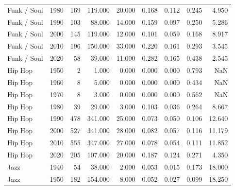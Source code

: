 \begin{table}
{\begin{tabular}{lrrrrrrrr}
           Funk / Soul &           1980 &        169 &  119.000 &   20.000 &        0.168 &  0.112 &  0.245 &                  4.950 \\
           Funk / Soul &           1990 &        103 &   88.000 &   14.000 &        0.159 &  0.097 &  0.250 &                  5.286 \\
           Funk / Soul &           2000 &        145 &  119.000 &   12.000 &        0.101 &  0.059 &  0.168 &                  8.917 \\
           Funk / Soul &           2010 &        196 &  150.000 &   33.000 &        0.220 &  0.161 &  0.293 &                  3.545 \\
           Funk / Soul &           2020 &         58 &   39.000 &   11.000 &        0.282 &  0.165 &  0.438 &                  2.545 \\
               Hip Hop &           1950 &          2 &    1.000 &    0.000 &        0.000 &  0.000 &  0.793 &                    NaN \\
               Hip Hop &           1960 &          8 &    5.000 &    0.000 &        0.000 &  0.000 &  0.434 &                    NaN \\
               Hip Hop &           1970 &          8 &    3.000 &    0.000 &        0.000 &  0.000 &  0.562 &                    NaN \\
               Hip Hop &           1980 &         39 &   29.000 &    3.000 &        0.103 &  0.036 &  0.264 &                  8.667 \\
               Hip Hop &           1990 &        478 &  341.000 &   25.000 &        0.073 &  0.050 &  0.106 &                 12.640 \\
               Hip Hop &           2000 &        527 &  341.000 &   28.000 &        0.082 &  0.057 &  0.116 &                 11.179 \\
               Hip Hop &           2010 &        555 &  347.000 &   27.000 &        0.078 &  0.054 &  0.111 &                 11.852 \\
               Hip Hop &           2020 &        205 &  107.000 &   20.000 &        0.187 &  0.124 &  0.271 &                  4.350 \\
                  Jazz &           1940 &         54 &   38.000 &    2.000 &        0.053 &  0.015 &  0.173 &                 18.000 \\
                  Jazz &           1950 &        182 &  154.000 &    8.000 &        0.052 &  0.027 &  0.099 &                 18.250 \\

\end{tabular}}
\end{table}
